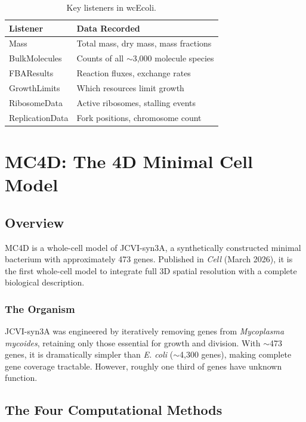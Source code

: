 \documentclass[11pt,a4paper]{report}
\begin{document}
\begin{table}[h]
\centering
\begin{tabular}{ll}
\toprule
\textbf{Listener} & \textbf{Data Recorded} \\
\midrule
Mass & Total mass, dry mass, mass fractions \\
BulkMolecules & Counts of all $\sim$3,000 molecule species \\
FBAResults & Reaction fluxes, exchange rates \\
GrowthLimits & Which resources limit growth \\
RibosomeData & Active ribosomes, stalling events \\
ReplicationData & Fork positions, chromosome count \\
\bottomrule
\end{tabular}
\caption{Key listeners in wcEcoli.}
\end{table}

\chapter{MC4D: The 4D Minimal Cell Model}

\section{Overview}

MC4D is a whole-cell model of JCVI-syn3A, a synthetically constructed minimal bacterium with approximately 473 genes. Published in \emph{Cell} (March 2026), it is the first whole-cell model to integrate full 3D spatial resolution with a complete biological description.

\subsection{The Organism}

JCVI-syn3A was engineered by iteratively removing genes from \emph{Mycoplasma mycoides}, retaining only those essential for growth and division. With $\sim$473 genes, it is dramatically simpler than \emph{E. coli} ($\sim$4,300 genes), making complete gene coverage tractable. However, roughly one third of genes have unknown function.

\section{The Four Computational Methods}
\end{document}
